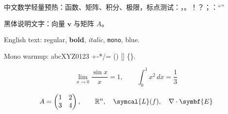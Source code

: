 


\begin{preview}

中文数学轻量预热：函数、矩阵、积分、极限，标点测试：，。！？；：“”

{\sffamily 黑体说明文字：向量 $\symbf{v}$ 与矩阵 $A$。}

English text: regular, \textbf{bold}, \textit{italic}, \texttt{mono},
{\color{blue}blue}.

{\ttfamily Mono warmup: abcXYZ0123 +-*/= () [] \{\}.}

\[
  \lim_{x\to 0}\frac{\sin x}{x}=1,\qquad
  \int_0^1 x^2\,dx=\frac{1}{3}
\]

\[
  A =
  \begin{pmatrix}
    1 & 2\\
    3 & 4
  \end{pmatrix},
  \qquad
  \mathbb{R}^n,\quad \symcal{L}(f),\quad \nabla\cdot\symbf{E}
\]

\end{preview}

